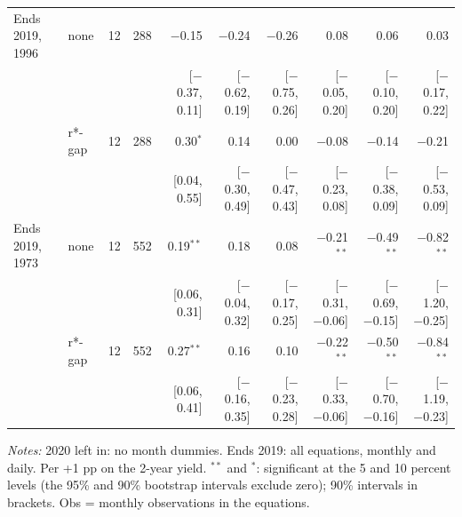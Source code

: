 \begin{table}[tp]
{\begin{tabular}{llcrrrrrrr}
\addlinespace
Ends 2019, 1996 & none & 12 & 288 & $-$0.15 & $-$0.24 & $-$0.26 & 0.08 & 0.06 & 0.03\\
 & & & & {\scriptsize [$-$0.37, 0.11]} & {\scriptsize [$-$0.62, 0.19]} & {\scriptsize [$-$0.75, 0.26]} & {\scriptsize [$-$0.05, 0.20]} & {\scriptsize [$-$0.10, 0.20]} & {\scriptsize [$-$0.17, 0.22]}\\
 & r*-gap & 12 & 288 & 0.30$^{*}$ & 0.14 & 0.00 & $-$0.08 & $-$0.14 & $-$0.21\\
 & & & & {\scriptsize [0.04, 0.55]} & {\scriptsize [$-$0.30, 0.49]} & {\scriptsize [$-$0.47, 0.43]} & {\scriptsize [$-$0.23, 0.08]} & {\scriptsize [$-$0.38, 0.09]} & {\scriptsize [$-$0.53, 0.09]}\\
\addlinespace
Ends 2019, 1973 & none & 12 & 552 & 0.19$^{**}$ & 0.18 & 0.08 & $-$0.21$^{**}$ & $-$0.49$^{**}$ & $-$0.82$^{**}$\\
 & & & & {\scriptsize [0.06, 0.31]} & {\scriptsize [$-$0.04, 0.32]} & {\scriptsize [$-$0.17, 0.25]} & {\scriptsize [$-$0.31, $-$0.06]} & {\scriptsize [$-$0.69, $-$0.15]} & {\scriptsize [$-$1.20, $-$0.25]}\\
 & r*-gap & 12 & 552 & 0.27$^{**}$ & 0.16 & 0.10 & $-$0.22$^{**}$ & $-$0.50$^{**}$ & $-$0.84$^{**}$\\
 & & & & {\scriptsize [0.06, 0.41]} & {\scriptsize [$-$0.16, 0.35]} & {\scriptsize [$-$0.23, 0.28]} & {\scriptsize [$-$0.33, $-$0.06]} & {\scriptsize [$-$0.70, $-$0.16]} & {\scriptsize [$-$1.19, $-$0.23]}\\
\bottomrule\end{tabular}}
\begin{flushleft}\footnotesize\textit{Notes:} 2020 left in: no month dummies. Ends 2019: all equations, monthly and daily. Per +1 pp on the 2-year yield. $^{**}$ and $^{*}$: significant at the 5 and 10 percent levels (the 95\% and 90\% bootstrap intervals exclude zero); 90\% intervals in brackets. Obs = monthly observations in the equations.\end{flushleft}
\end{table}
